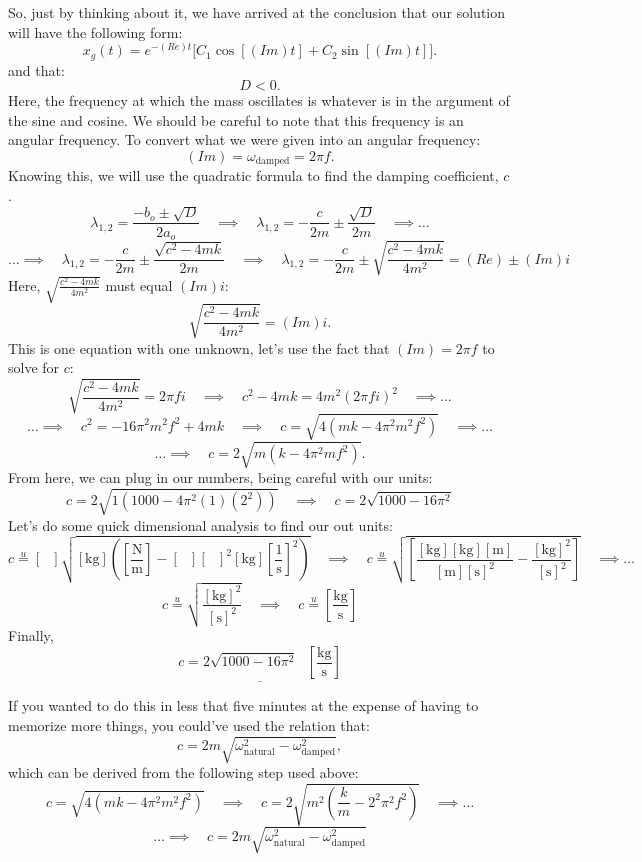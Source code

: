 \documentclass[a4paper,12pt]{article} %
\begin{document}
So, just by thinking about it, we have arrived at the conclusion that our solution will have the following form:
$$ x_g(t) =e^{-(Re) t}\bigg[C_1\cos [(Im) t]+C_2\sin [(Im) t]\bigg]. $$
and that:
$$ D<0. $$
Here, the frequency at which the mass oscillates is whatever is in the argument of the sine and cosine. We should be careful to note that this frequency is an angular frequency. To convert what we were given into an angular frequency:
$$ (Im) =  \omega_{\text{damped}} = 2\pi f. $$
Knowing this, we will use the quadratic formula to find the damping coefficient, $c$.
$$ \lambda_{1,2} = \frac{-b_o \pm \sqrt{D}}{2a_o} \quad\implies\quad \lambda_{1,2} = -\frac{c}{2m} \pm \frac{\sqrt{D}}{2m} \quad \implies\ldots$$
$$\ldots\implies\quad \lambda_{1,2} = -\frac{c}{2m} \pm \frac{\sqrt{c^2-4mk}}{2m} \quad\implies\quad \lambda_{1,2} = -\frac{c}{2m} \pm \sqrt{\frac{c^2-4mk}{4m^2}} = (Re)\pm (Im)i  $$
Here, $\sqrt{\frac{c^2-4mk}{4m^2}}$ must equal $(Im)i$:
$$ \sqrt{\frac{c^2-4mk}{4m^2}} = (Im)i.$$
This is one equation with one unknown, let's use the fact that $(Im)=2\pi f$ to solve for $c$:
$$ \sqrt{\frac{c^2-4mk}{4m^2}} = 2\pi fi \quad\implies\quad c^2 -4mk = 4m^2(2\pi f i)^2 \quad\implies\ldots $$
$$\ldots\implies\quad  c^2 = -16\pi^2 m^2f^2 + 4mk \quad\implies\quad c = \sqrt{4(mk-4\pi^2m^2f^2)}\quad\implies\ldots$$
$$ \ldots\implies\quad c = 2\sqrt{m(k-4\pi^2mf^2)}. $$
From here, we can plug in our numbers, being careful with our units:
$$ c = 2\sqrt{1(1000-4\pi^2(1)(2^2))} \quad\implies\quad \boxed{c= 2\sqrt{1000-16\pi^2}} $$
Let's do some quick dimensional analysis to find our out units:
$$c \overset{u}= [\text{ }]\sqrt{[\text{kg}]\left(\left[\frac{\text{N}}{\text{m}}\right] - [\text{ }][\text{ }]^2[\text{kg}]\left[\frac{1}{\text{s}}\right]^2\right)} \quad\implies\quad c\overset{u}= \sqrt{\left[\frac{[\text{kg}][\text{kg}][\text{m}]}{[\text{m}][\text{s}]^2} - \frac{[\text{kg}]^2}{[\text{s}]^2}\right]} \quad\implies\ldots $$
$$ c\overset{u}=\sqrt{\frac{[\text{kg}]^2}{[\text{s}]^2}} \quad\implies\quad \boxed{c\overset{u}=\left[\frac{\text{kg}}{\text{s}}\right]} $$
Finally,
$$ \underline{\boxed{c= 2\sqrt{1000-16\pi^2} \text{ }\left[\frac{\text{kg}}{\text{s}}\right]}}  $$




If you wanted to do this in less that five minutes at the expense of having to memorize more things, you could've used the relation that:
$$ c=2m\sqrt{\omega^2_{\text{natural}} - \omega^2_{\text{damped}}}, $$
which can be derived from the following step used above:
$$c = \sqrt{4(mk-4\pi^2m^2f^2)} \quad\implies\quad c = 2\sqrt{m^2\left(\frac{k}{m}-2^2\pi^2f^2\right)}\quad\implies\ldots $$
$$\ldots\implies\quad \boxed{c = 2m\sqrt{\omega_{\text{natural}}^2 - \omega_{\text{damped}}^2}  } $$
\end{document}
